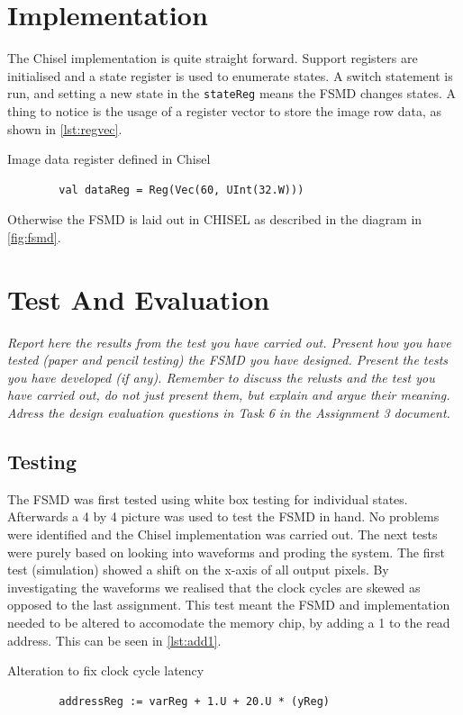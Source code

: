 \documentclass[a4paper, english]{article}
\numberwithin{equation}{section}
\begin{document}
\section{Implementation}
The Chisel implementation is quite straight forward. Support registers are initialised and a state register is used to enumerate states. A switch statement is run, and setting a new state in the \texttt{stateReg} means the FSMD changes states. A thing to notice is the usage of a register vector to store the image row data, as shown in \cref{lst:regvec}.
\begin{listing}[H]
    \centering
    \caption{Image data register defined in Chisel}\label{lst:regvec}
    \begin{verbatim}
        val dataReg = Reg(Vec(60, UInt(32.W)))
\end{verbatim}
\end{listing}
Otherwise the FSMD is laid out in CHISEL as described in the diagram in \cref{fig:fsmd}.
\section{Test And Evaluation}
\textit{Report here the results from the test you have carried out. Present how you have tested (paper and pencil testing) the FSMD you have designed. Present the tests you have developed (if any). Remember to discuss the relusts and the test you have carried out, do not just present them, but explain and argue their meaning. Adress the design evaluation questions in Task 6 in the Assignment 3 document.}
\subsection{Testing}
The FSMD was first tested using white box testing for individual states. Afterwards a 4 by 4 picture was used to test the FSMD in hand. No problems were identified and the Chisel implementation was carried out. The next tests were purely based on looking into waveforms and proding the system. The first test (simulation) showed a shift on the x-axis of all output pixels. By investigating the waveforms we realised that the clock cycles are skewed as opposed to the last assignment. This test meant the FSMD and implementation needed to be altered to accomodate the memory chip, by adding a 1 to the read address. This can be seen in \cref{lst:add1}.
\begin{listing}[H]
    \centering
    \caption{Alteration to fix clock cycle latency}\label{lst:add1}
    \begin{verbatim}
        addressReg := varReg + 1.U + 20.U * (yReg)
\end{verbatim}
\end{listing}
\end{document}
